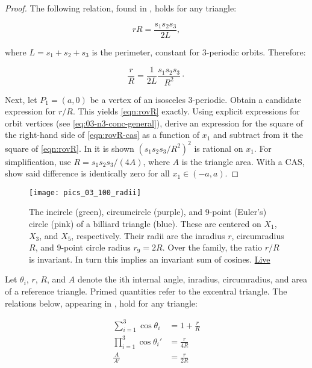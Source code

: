 \begin{proof}
The following relation, found in \cite{johnson1960}, holds for any triangle:

\begin{equation*}
 r R=\frac{s_1s_2s_3}{2 L}, 
\end{equation*}

\noindent where $L=s_1+s_2+s_3$ is the perimeter, constant for 3-periodic orbits. Therefore:

\begin{equation}
\frac{r}{R}=\frac{1}{2L} \frac{s_1s_2s_3}{R^2}\cdot
\label{eqn:rovR-cas}
\end{equation}

Next, let $P_1=(a,0)$ be a vertex of an isosceles 3-periodic. Obtain a candidate expression for $r/R$. This yields \eqref{eqn:rovR} exactly. Using explicit expressions for orbit vertices (see \cref{eq:03-n3-conc-general}), derive an expression for the square of the right-hand side of \eqref{eqn:rovR-cas} as a function of $x_1$ and subtract from it the square of \eqref{eqn:rovR}. In  \cite{garcia2020-new-properties}
it is shown $\left(s_1s_2s_3/R^2\right)^2$ is rational on $x_1$. For simplification, use $R=s_1 s_2 s_3/(4A)$, where $A$ is the triangle area. With a CAS, show said difference is identically zero for all $x_1\in(-a,a)$.
\end{proof}


\begin{figure}
    \centering
    \texttt{[image: pics\_03\_100\_radii]}
    \caption{The incircle (green), circumcircle (purple), and 9-point (Euler's) circle (pink) of a billiard triangle (blue). These are centered on $X_1$, $X_3$, and $X_5$, respectively. Their radii are the inradius $r$, circumradius $R$, and 9-point circle radius $r_9=2R$. Over the family, the ratio $r/R$ is invariant. In turn this implies an invariant sum of cosines. \href{https://bit.ly/337hvpf}{Live}}
    \label{fig:radii}
\end{figure}

Let $\theta_i$, $r$, $R$, and $A$ denote the ith internal angle, inradius, circumradius, and area of a reference triangle. Primed quantities refer to the excentral triangle. The relations below, appearing in  \cite{johnson1960},  hold for any triangle:

\begin{align}
\sum_{i=1}^{3}{\cos\theta_i}&=1+\frac{r}{R} \label{eqn:03-sum-cos} \\
\prod_{i=1}^{3}{\cos\theta_i'}&=\frac{r}{4R} \label{eqn:03-exc-prod-cos} \\
\frac{A}{A'}&=\frac{r}{2R} \label{eqn:03-area-ratio}
\end{align}

